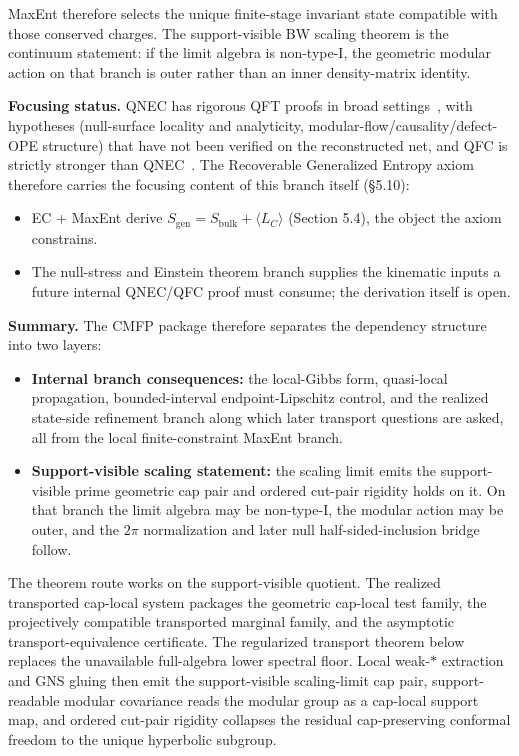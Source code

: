 MaxEnt therefore selects the unique finite-stage invariant state compatible with those conserved charges. The support-visible BW scaling theorem is the continuum statement: if the limit algebra is non-type-I, the geometric modular action on that branch is outer rather than an inner density-matrix identity.

\textbf{Focusing status.} QNEC has rigorous QFT proofs in broad settings~\cite{bousso16,balakrishnan19}, with hypotheses (null-surface locality and analyticity, modular-flow/causality/defect-OPE structure) that have not been verified on the reconstructed net, and QFC is strictly stronger than QNEC~\cite{bousso15qfc}. The Recoverable Generalized Entropy axiom therefore carries the focusing content of this branch itself (\S{}5.10):
\begin{itemize}
\item
EC + MaxEnt derive \(S_{\mathrm{gen}}=S_{\mathrm{bulk}}+\langle L_C\rangle\) (Section 5.4), the object the axiom constrains.
\item
The null-stress and Einstein theorem branch supplies the kinematic inputs a future internal QNEC/QFC proof must consume; the derivation itself is open.
\end{itemize}

\textbf{Summary.} The CMFP package therefore separates the dependency structure into two layers:
\begin{itemize}
\item
\textbf{Internal branch consequences:} the local-Gibbs form, quasi-local propagation, bounded-interval endpoint-Lipschitz control, and the realized state-side refinement branch along which later transport questions are asked, all from the local finite-constraint MaxEnt branch.
\item
\textbf{Support-visible scaling statement:} the scaling limit emits the support-visible prime geometric cap pair and ordered cut-pair rigidity holds on it. On that branch the limit algebra may be non-type-I, the modular action may be outer, and the \(2\pi\) normalization and later null half-sided-inclusion bridge follow.
\end{itemize}

The theorem route works on the support-visible quotient. The realized transported cap-local system packages the geometric cap-local test family, the projectively compatible transported marginal family, and the asymptotic transport-equivalence certificate. The regularized transport theorem below replaces the unavailable full-algebra lower spectral floor. Local weak-\(*\) extraction and GNS gluing then emit the support-visible scaling-limit cap pair, support-readable modular covariance reads the modular group as a cap-local support map, and ordered cut-pair rigidity collapses the residual cap-preserving conformal freedom to the unique hyperbolic subgroup.

